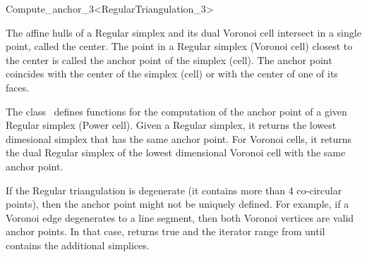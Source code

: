 \ccRefPageBegin

\begin{ccRefClass}{Compute_anchor_3<RegularTriangulation_3>}

\ccDefinition

The affine hulls of a Regular simplex and its dual Voronoi cell
intersect in a single point, called the center. The point in a Regular
simplex (Voronoi cell) closest to the center is called the anchor
point of the simplex (cell). The anchor point coincides with the
center of the simplex (cell) or with the center of one of its faces.

The class \ccRefName\ defines functions for the computation of the
anchor point of a given Regular simplex (Power cell). Given a Regular
simplex, it returns the lowest dimesional simplex that has the same
anchor point. For Voronoi cells, it returns the dual Regular simplex
of the lowest dimensional Voronoi cell with the same anchor point.

If the Regular triangulation is degenerate (it contains more than 4
co-circular points), then the anchor point might not be uniquely
defined. For example, if a Voronoi edge degenerates to a line segment,
then both Voronoi vertices are valid anchor points. In that case,
 returns true and the iterator range from
 until 
contains the additional simplices.


\ccTypes
{}
\ccThreeToTwo

\ccGlue
{}
\ccGlue
{}
\ccGlue
{}


\end{ccRefClass}
